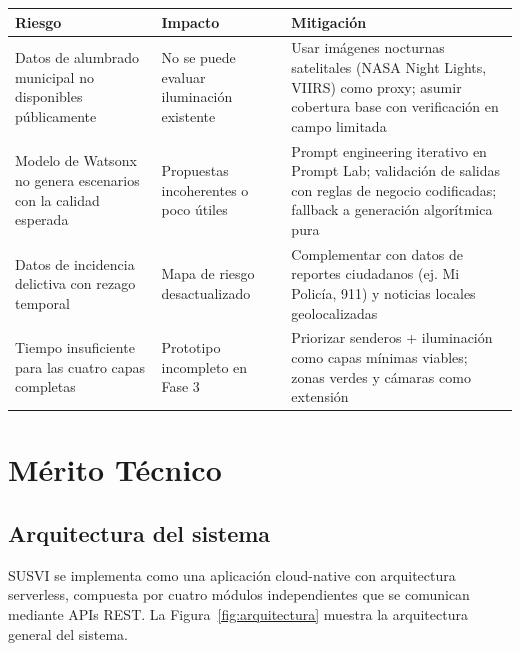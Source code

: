 \documentclass[12pt,a4paper]{article}
\begin{document}
\begin{table}[H]
\centering
\small
\begin{tabularx}{\textwidth}{X X X}
\toprule
\textbf{Riesgo} & \textbf{Impacto} & \textbf{Mitigación} \\
\midrule
Datos de alumbrado municipal no disponibles públicamente & No se puede evaluar iluminación existente & Usar imágenes nocturnas satelitales (NASA Night Lights, VIIRS) como proxy; asumir cobertura base con verificación en campo limitada \\
\midrule
Modelo de Watsonx no genera escenarios con la calidad esperada & Propuestas incoherentes o poco útiles & Prompt engineering iterativo en Prompt Lab; validación de salidas con reglas de negocio codificadas; fallback a generación algorítmica pura \\
\midrule
Datos de incidencia delictiva con rezago temporal & Mapa de riesgo desactualizado & Complementar con datos de reportes ciudadanos (ej. Mi Policía, 911) y noticias locales geolocalizadas \\
\midrule
Tiempo insuficiente para las cuatro capas completas & Prototipo incompleto en Fase 3 & Priorizar senderos + iluminación como capas mínimas viables; zonas verdes y cámaras como extensión \\
\bottomrule
\end{tabularx}
\end{table}


\section{Mérito Técnico}

\subsection{Arquitectura del sistema}

SUSVI se implementa como una aplicación cloud-native con arquitectura serverless, compuesta por cuatro módulos independientes que se comunican mediante APIs REST. La Figura~\ref{fig:arquitectura} muestra la arquitectura general del sistema.
\end{document}
